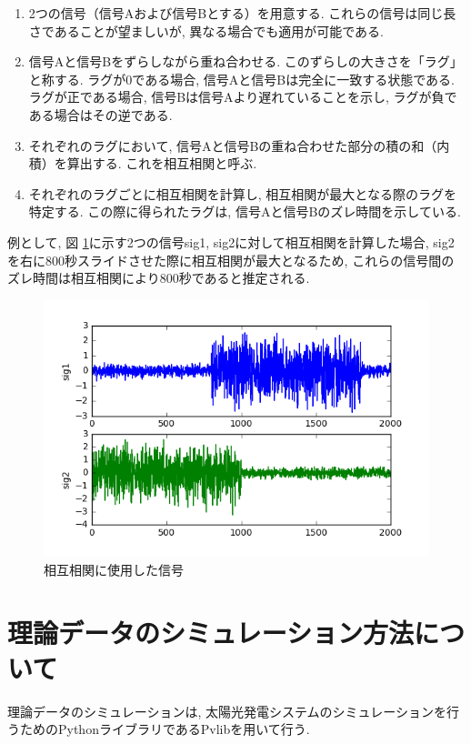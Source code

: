\documentclass[a4j,12pt,]{jarticle}
\begin{document}
\begin{enumerate}
\item 2つの信号（信号Aおよび信号Bとする）を用意する. これらの信号は同じ長さであることが望ましいが, 異なる場合でも適用が可能である. 
\item 信号Aと信号Bをずらしながら重ね合わせる. このずらしの大きさを「ラグ」と称する. ラグが0である場合, 信号Aと信号Bは完全に一致する状態である. ラグが正である場合, 信号Bは信号Aより遅れていることを示し, ラグが負である場合はその逆である. 
\item それぞれのラグにおいて, 信号Aと信号Bの重ね合わせた部分の積の和（内積）を算出する. これを相互相関と呼ぶ. 
\item それぞれのラグごとに相互相関を計算し, 相互相関が最大となる際のラグを特定する. この際に得られたラグは, 信号Aと信号Bのズレ時間を示している. 
\end{enumerate}

例として, 図 \ref{p1}に示す2つの信号sig1, sig2に対して相互相関を計算した場合, sig2を右に800秒スライドさせた際に相互相関が最大となるため, これらの信号間のズレ時間は相互相関により800秒であると推定される. 

\begin{figure}[H]
  \begin{center}
    \includegraphics[width=160mm]{1.png}
    \caption{相互相関に使用した信号}
    \label{p1}
  \end{center}
\end{figure}

\section{理論データのシミュレーション方法について}
理論データのシミュレーションは, 太陽光発電システムのシミュレーションを行うためのPythonライブラリであるPvlibを用いて行う. 
\end{document}
